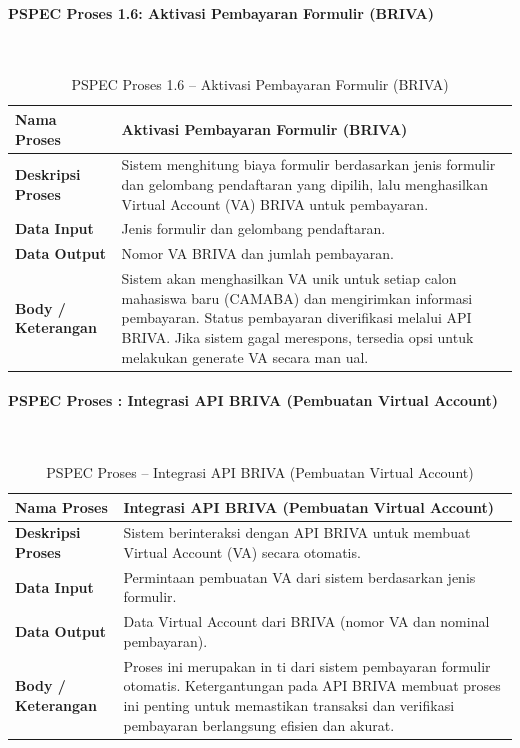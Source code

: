 \paragraph{PSPEC Proses 1.6: Aktivasi Pembayaran Formulir (BRIVA)}~\\
\begin{longtable}{|p{}|p{}|}
	\caption{PSPEC Proses 1.6 -- Aktivasi Pembayaran Formulir (BRIVA)}
	\label{table:3.pspec16}\\
	\hline
	\textbf{Nama Proses} & Aktivasi Pembayaran Formulir (BRIVA) \\
	\hline
	\textbf{Deskripsi Proses} & Sistem menghitung biaya formulir berdasarkan jenis formulir dan gelombang pendaftaran yang dipilih, lalu menghasilkan Virtual Account (VA) BRIVA untuk pembayaran. \\
	\hline
	\textbf{Data Input} & Jenis formulir dan gelombang pendaftaran. \\
	\hline
	\textbf{Data Output} & Nomor VA BRIVA dan jumlah pembayaran. \\
	\hline
	\textbf{Body / Keterangan} & Sistem akan menghasilkan VA unik untuk setiap calon mahasiswa baru (CAMABA) dan mengirimkan informasi pembayaran. Status pembayaran diverifikasi melalui API BRIVA. Jika sistem gagal merespons, tersedia opsi untuk melakukan generate VA secara man ual. \\
	\hline
\end{longtable}


\paragraph{PSPEC Proses : Integrasi API BRIVA (Pembuatan Virtual Account)}~\\
\begin{longtable}{|p{}|p{}|}
	\caption{PSPEC Proses  -- Integrasi API BRIVA (Pembuatan Virtual Account)}
	\label{table:3.pspec}\\
	\hline
	\textbf{Nama Proses} & Integrasi API BRIVA (Pembuatan Virtual Account) \\
	\hline
	\textbf{Deskripsi Proses} & Sistem berinteraksi dengan API BRIVA untuk membuat Virtual Account (VA) secara otomatis. \\
	\hline
	\textbf{Data Input} & Permintaan pembuatan VA dari sistem berdasarkan jenis formulir. \\
	\hline
	\textbf{Data Output} & Data Virtual Account dari BRIVA (nomor VA dan nominal pembayaran). \\
	\hline
	\textbf{Body / Keterangan} & Proses ini merupakan in ti dari sistem pembayaran formulir otomatis. Ketergantungan pada API BRIVA membuat proses ini penting untuk memastikan transaksi dan verifikasi pembayaran berlangsung efisien dan akurat. \\
	\hline
\end{longtable}


